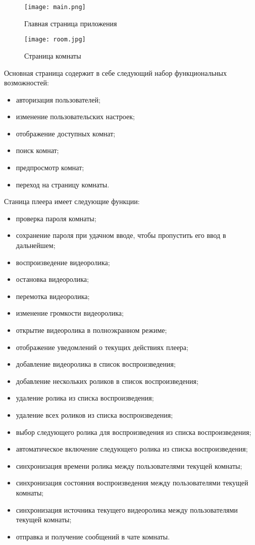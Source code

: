 \begin{figure}[H]
 \centering
   \texttt{[image: main.png]} 
   \caption{Главная страница приложения}
   \label{fig:arch:main_page}
\end{figure}
 
\begin{figure}[H]
 \centering
   \texttt{[image: room.jpg]} 
   \caption{Страница комнаты}
   \label{fig:arch:room_page}
\end{figure}
 
Основная страница содержит в себе следующий набор функциональных возможностей:
\begin{itemize}
 \item авторизация пользователей;
 \item изменение пользовательских настроек;
 \item отображение доступных комнат;
 \item поиск комнат;
 \item предпросмотр комнат;
 \item переход на страницу комнаты.
\end{itemize}
 
Станица плеера имеет следующие функции:
\begin{itemize}
 \item проверка пароля комнаты;
 \item сохранение пароля при удачном вводе, чтобы пропустить его ввод в дальнейшем;
 \item воспроизведение видеоролика;
 \item остановка видеоролика;
 \item перемотка видеоролика;
 \item изменение громкости видеоролика;
 \item открытие видеоролика в полноэкранном режиме;
 \item отображение уведомлений о текущих действиях плеера;
 \item добавление видеоролика в список воспроизведения;
 \item добавление нескольких роликов в список воспроизведения;
 \item удаление ролика из списка воспроизведения;
 \item удаление всех роликов из списка воспроизведения;
 \item выбор следующего ролика для воспроизведения из списка воспроизведения;
 \item автоматическое включение следующего ролика из списка воспроизведения;
 \item синхронизация времени ролика между пользователями текущей комнаты;
 \item синхронизация состояния воспроизведения между пользователями текущей комнаты;
 \item синхронизация источника текущего видеоролика между пользователями текущей комнаты;
 \item отправка и получение сообщений в чате комнаты.
\end{itemize}
 
